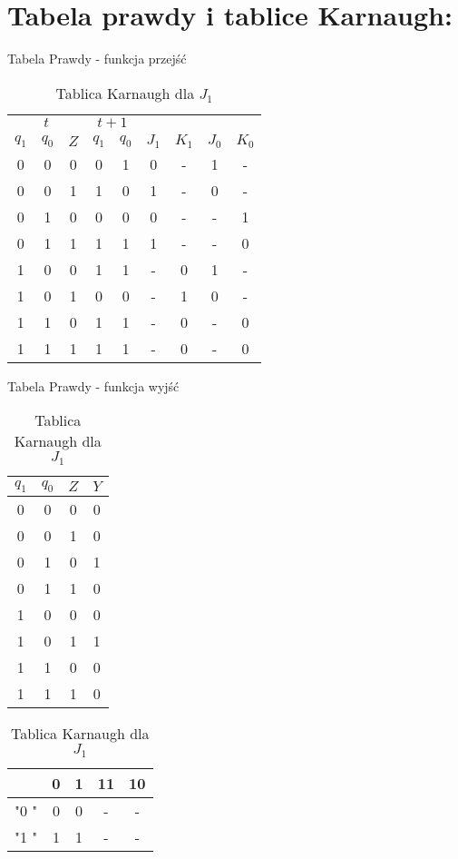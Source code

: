 \documentclass[12pt,a4paper]{article}
\begin{document}
		\section{Tabela prawdy i tablice Karnaugh:}
			\begin{table}[H]
			\begin{minipage}{.5\textwidth}
				\caption{Tabela Prawdy - funkcja przejść}
				\vspace{0.2cm}
				\centering
				\begin{tabular}{ccc|cc|cccc}
					\multicolumn{3}{c|}{\(t\)}	&	\multicolumn{2}{c|}{\(t+1\)} &&&\\
					\(q_1\)	&	\(q_0\)	&	\(Z\)	&	\(q_1\)	&	\(q_0\)	&	\(J_1\)	&	\(K_1\)	&	\(J_0\)	&	\(K_0\)	\\\hline
					0	&	0	&	0	&	0	&	1	&	0	&	-	&	1	&	-	\\
					0	&	0	&	1	&	1	&	0	&	1	&	-	&	0	&	-	\\
					0	&	1	&	0	&	0	&	0	&	0	&	-	&	-	&	1	\\
					0	&	1	&	1	&	1	&	1	&	1	&	-	&	-	&	0	\\\hline
					1	&	0	&	0	&	1	&	1	&	-	&	0	&	1	&	-	\\
					1	&	0	&	1	&	0	&	0	&	-	&	1	&	0	&	-	\\
					1	&	1	&	0	&	1	&	1	&	-	&	0	&	-	&	0	\\
					1	&	1	&	1	&	1	&	1	&	-	&	0	&	-	&	0	\\
				\end{tabular}
				\vspace{2cm}
			
				\caption{Tabela Prawdy - funkcja wyjść}
				\vspace{0.2cm}
				\centering
				\begin{tabular}{ccc|c}
					\(q_1\)	&	\(q_0\)	&	\(Z\)	&	\(Y\)	\\\hline
					0	&	0	&	0	&	0	\\
					0	&	0	&	1	&	0	\\
					0	&	1	&	0	&	1	\\
					0	&	1	&	1	&	0	\\\hline
					1	&	0	&	0	&	0	\\
					1	&	0	&	1	&	1	\\
					1	&	1	&	0	&	0	\\
					1	&	1	&	1	&	0	\\
				\end{tabular}
			\end{minipage}%
			\begin{minipage}{.5\textwidth}
				\caption{Tablica Karnaugh dla $J_1$}
				\vspace{0.2cm}
				\centering
				\begin{tabular}{c|c|c|c|c}
					\backslashbox{$Z$}{$q_1q_0$}	&	0	&	1	&	11	&	10	\\\hline
					"0	"	&	0	&	0	&	-	&	-	\\\hline
					"1	"	&	1	&	1	&	-	&	-	
				\end{tabular}
				

\end{minipage}
\end{table}
\end{document}
